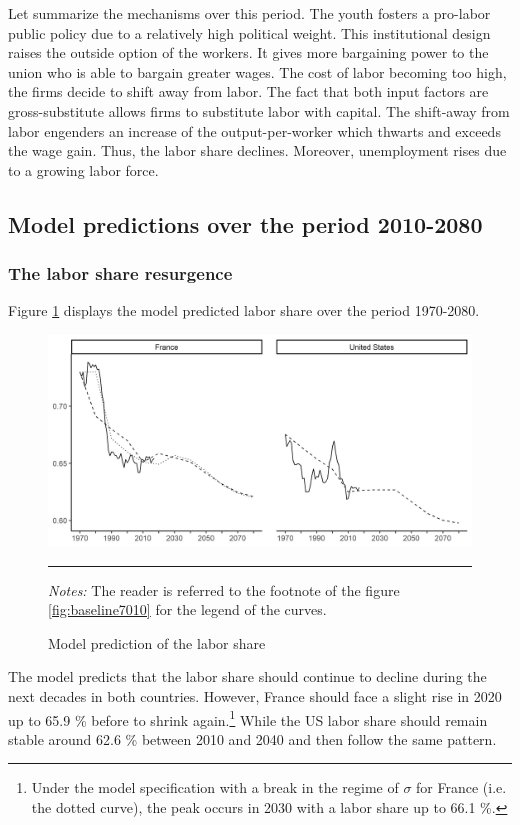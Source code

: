 Let summarize the mechanisms over this period. The youth fosters a pro-labor public policy due to a relatively high political weight. This institutional design raises the outside option of the workers. It gives more bargaining power to the union who is able to bargain greater wages. The cost of labor becoming too high, the firms decide to shift away from labor. The fact that both input factors are gross-substitute allows firms to substitute labor with capital. The shift-away from labor engenders an increase of the output-per-worker which thwarts and exceeds the wage gain. Thus, the labor share declines. Moreover, unemployment rises due to a growing labor force.

\subsection{Model predictions over the period 2010-2080}

\subsubsection{The labor share resurgence}

Figure \ref{fig:baseline1080} displays the model predicted labor share over the period 1970-2080.
\begin{figure}[tb]
	\centering
	\includegraphics[width=1\linewidth]{../result/baseline7080.png}
	\caption{Model prediction of the labor share}
	\label{fig:baseline1080}
	\vspace{.5ex}
	\hrule
	\vspace{-4ex}
	\justify\singlespacing\footnotesize \textit{Notes:} The reader is referred to the footnote of the figure \ref{fig:baseline7010} for the legend of the curves.
\end{figure}
The model predicts that the labor share should continue to decline during the next decades in both countries. However, France should face a slight rise in 2020 up to 65.9 \% before to shrink again.\footnote{Under the model specification with a break in the regime of $\sigma$ for France (i.e. the dotted curve), the peak occurs in 2030 with a labor share up to 66.1 \%.} While the US labor share should remain stable around 62.6 \% between 2010 and 2040 and then follow the same pattern.

